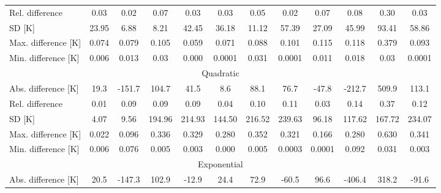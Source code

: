 \begin{table}
\begin{tabular}{lccccccccccc}
        Rel. difference         & 0.03                           & 0.02                          & 0.07    & 0.03    & 0.03    & 0.05    & 0.02    & 0.07    & 0.08    & 0.30    & 0.03    \\
        SD {[}K{]}              & 23.95                          & 6.88                          & 8.21    & 42.45   & 36.18   & 11.12   & 57.39   & 27.09   & 45.99   & 93.41   & 58.86   \\
        Max. difference {[}K{]} & 0.074                          & 0.079                         & 0.105   & 0.059   & 0.071   & 0.088   & 0.101   & 0.115   & 0.118   & 0.379   & 0.093   \\
        Min. difference {[}K{]} & 0.006                          & 0.013                         & 0.03    & 0.000   & 0.0001  & 0.031   & 0.0001  & 0.011   & 0.018   & 0.03    & 0.0001  \\ \hline
        \multicolumn{12}{c}{Quadratic}                                                                                                                                                 \\ \hline
        Abs. difference {[}K{]} & 19.3                           & -151.7                        & 104.7   & 41.5    & 8.6     & 88.1    & 76.7    & -47.8   & -212.7  & 509.9   & 113.1   \\
        Rel. difference         & 0.01                           & 0.09                          & 0.09    & 0.09    & 0.04    & 0.10    & 0.11    & 0.03    & 0.14    & 0.37    & 0.12    \\
        SD {[}K{]}              & 4.07                           & 9.56                          & 194.96  & 214.93  & 144.50  & 216.52  & 239.63  & 96.18   & 117.62  & 167.72  & 234.07  \\
        Max. difference {[}K{]} & 0.022                          & 0.096                         & 0.336   & 0.329   & 0.280   & 0.352   & 0.321   & 0.166   & 0.280   & 0.630   & 0.341   \\
        Min. difference {[}K{]} & 0.006                          & 0.076                         & 0.005   & 0.003   & 0.000   & 0.005   & 0.0003  & 0.0001  & 0.092   & 0.031   & 0.003   \\ \hline
        \multicolumn{12}{c}{Exponential}                                                                                                                                                   \\ \hline
        Abs. difference {[}K{]} & 20.5                           & -147.3                        & 102.9   & -12.9   & 24.4    & 72.9    & -60.5   & 96.6    & -406.4  & 318.2   & -91.6   \\

\end{tabular}
\end{table}
